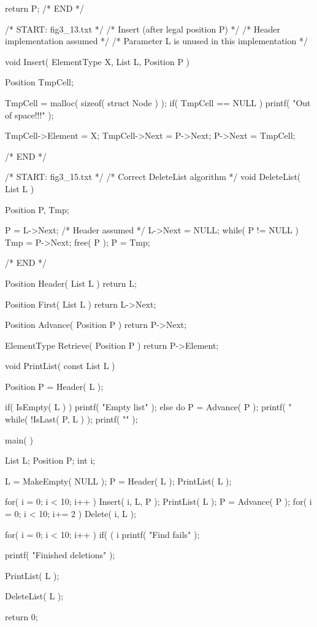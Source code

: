 \documentclass[12pt, a4paper]{article}
\begin{document}
\begin{code}
{    return P;
}
/* END */

/* START: fig3_13.txt */
/* Insert (after legal position P) */
/* Header implementation assumed */
/* Parameter L is unused in this implementation */

void Insert( ElementType X, List L, Position P )
{
    Position TmpCell;

    TmpCell = malloc( sizeof( struct Node ) );
    if( TmpCell == NULL )
        printf( "Out of space!!!" );

    TmpCell->Element = X;
    TmpCell->Next = P->Next;
    P->Next = TmpCell;
}
/* END */

/* START: fig3_15.txt */
/* Correct DeleteList algorithm */
void DeleteList( List L )
{
    Position P, Tmp;

    P = L->Next;  /* Header assumed */
    L->Next = NULL;
    while( P != NULL )
    {
        Tmp = P->Next;
        free( P );
        P = Tmp;
    }
}
/* END */

Position Header( List L )
{
    return L;
}

Position First( List L )
{
    return L->Next;
}

Position Advance( Position P )
{
    return P->Next;
}

ElementType Retrieve( Position P )
{
    return P->Element;
}

void PrintList( const List L )
{
    Position P = Header( L );

    if( IsEmpty( L ) )
        printf( "Empty list\n" );
    else
    {
        do
        {
            P = Advance( P );
            printf( "%
        } while( !IsLast( P, L ) );
        printf( "\n" );
    }
}

main( )
{
    List L;
    Position P;
    int i;

    L = MakeEmpty( NULL );
    P = Header( L );
    PrintList( L );

    for( i = 0; i < 10; i++ )
    {
        Insert( i, L, P );
        PrintList( L );
        P = Advance( P );
    }
    for( i = 0; i < 10; i+= 2 )
        Delete( i, L );

    for( i = 0; i < 10; i++ )
        if( ( i %
            printf( "Find fails\n" );

    printf( "Finished deletions\n" );

    PrintList( L );

    DeleteList( L );

    return 0;
}
\end{code}
\pagebreak
\end{document}

